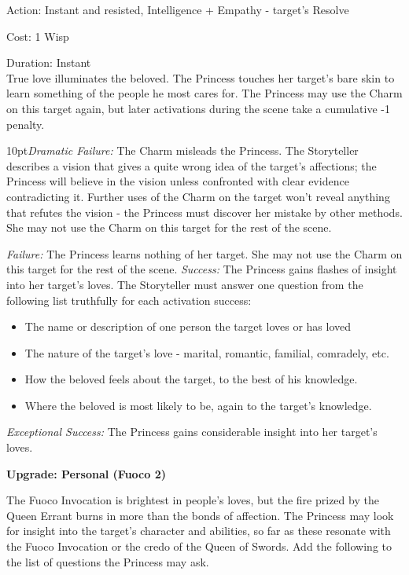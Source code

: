 \noindent Action: Instant and resisted, Intelligence + Empathy - target's Resolve

\noindent Cost: 1 Wisp

\noindent Duration: Instant\\

\noindent True love illuminates the beloved. The Princess touches her target's bare skin to learn something of the people he most cares for. The Princess may use the Charm on this target again, but later activations during the scene take a cumulative -1 penalty.

\begin{myindentpar}{10pt}\emph{Dramatic Failure:} The Charm misleads the Princess. The Storyteller describes a vision that gives a quite wrong idea of the target's affections; the Princess will believe in the vision unless confronted with clear evidence contradicting it. Further uses of the Charm on the target won't reveal anything that refutes the vision - the Princess must discover her mistake by other methods. She may not use the Charm on this target for the rest of the scene.


\emph{Failure:} The Princess learns nothing of her target. She may not use the Charm on this target for the rest of the scene.
\emph{Success:} The Princess gains flashes of insight into her target's loves. The Storyteller must answer one question from the following list truthfully for each activation success:

\begin{itemize}
\item The name or description of one person the target loves or has loved
\item The nature of the target's love - marital, romantic, familial, comradely, etc.
\item How the beloved feels about the target, to the best of his knowledge.
\item Where the beloved is most likely to be, again to the target's knowledge.
\end{itemize}

\emph{Exceptional Success:} The Princess gains considerable insight into her target's loves.

\textbf{Upgrade: Personal (Fuoco 2)}

The Fuoco Invocation is brightest in people's loves, but the fire prized by the Queen Errant burns in more than the bonds of affection. The Princess may look for insight into the target's character and abilities, so far as these resonate with the Fuoco Invocation or the credo of the Queen of Swords. Add the following to the list of questions the Princess may ask.


\end{myindentpar}

